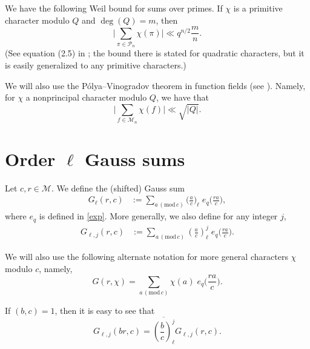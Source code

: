 \documentclass[12pt]{amsart}
\renewcommand{\pmod}[1]{\,(\mathrm{mod}\,#1)}
\def\cM{\mathcal{M}}
\newcommand{\legl}[2]{\left( \frac{#1}{#2} \right)_\ell}
\begin{document}
We have the following Weil bound for sums over primes. If $\chi$ is a primitive character modulo $Q$ and $\deg(Q)=m$, then
\begin{equation}
\label{weil}
\Big| \sum_{\pi \in \mathcal{P}_n} \chi(\pi) \Big| \ll q^{n/2} \frac{m}{n}.
\end{equation}
 (See equation (2.5) in \cite{rudnick}; the bound there is stated for quadratic characters, but it is easily generalized to any primitive characters.)


We will also use the P\'olya--Vinogradov theorem in function fields (see \cite[ Proposition $2.1$]{hsu}). Namely, for $\chi$ a nonprincipal character modulo $Q$, we have that
\begin{equation}
\label{pv}
\Big|  \sum_{f \in \mathcal{M}_n} \chi(f) \Big| \ll \sqrt{|Q|}.
\end{equation}

\section{Order $\ell$ Gauss sums}
\label{gauss-sums-section}

Let $c, r \in \cM$. We define the (shifted) Gauss sum
\begin{align} \label{def-GS}
G_\ell(r,c) &:=\sum_{a \pmod{c}} \Big( \frac{a}{c} \Big)_\ell \; {e_q} \Big( \frac{r a}{c} \Big),
\end{align}
where $e_q$ is defined in \eqref{exp}.
More generally, we also define for any integer $j$,
\begin{align*} %
G_{\ell, j}(r,c) &:=\sum_{a \pmod{c}} \legl{a}{c}^j \; {e_q} \Big( \frac{r a}{c} \Big).
\end{align*}

We will also use the following alternate notation for more general characters $\chi$ modulo $c$, namely,
\[
G(r,\chi)=\sum_{a \pmod{c}}\chi(a) \; {e_q} \Big( \frac{r a}{c} \Big).
\]

If $(b,c)=1$, then it is easy to see that 
\begin{equation}\label{eq:GS}G_{\ell,j}(br,c)= \overline{\legl{b}{c}^j} G_{\ell,j}(r,c).\end{equation}
\end{document}
